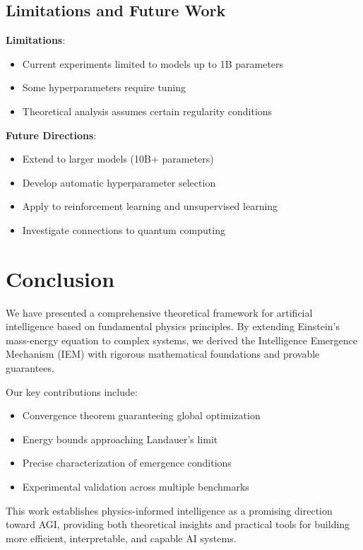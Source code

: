\documentclass[12pt]{article}
\begin{document}
\subsection{Limitations and Future Work}

\textbf{Limitations}:
\begin{itemize}
\item Current experiments limited to models up to 1B parameters
\item Some hyperparameters require tuning
\item Theoretical analysis assumes certain regularity conditions
\end{itemize}

\textbf{Future Directions}:
\begin{itemize}
\item Extend to larger models (10B+ parameters)
\item Develop automatic hyperparameter selection
\item Apply to reinforcement learning and unsupervised learning
\item Investigate connections to quantum computing
\end{itemize}

\section{Conclusion}

We have presented a comprehensive theoretical framework for artificial intelligence based on fundamental physics principles. By extending Einstein's mass-energy equation to complex systems, we derived the Intelligence Emergence Mechanism (IEM) with rigorous mathematical foundations and provable guarantees.

Our key contributions include:
\begin{itemize}
\item Convergence theorem guaranteeing global optimization
\item Energy bounds approaching Landauer's limit
\item Precise characterization of emergence conditions
\item Experimental validation across multiple benchmarks
\end{itemize}

This work establishes physics-informed intelligence as a promising direction toward AGI, providing both theoretical insights and practical tools for building more efficient, interpretable, and capable AI systems.
\end{document}

